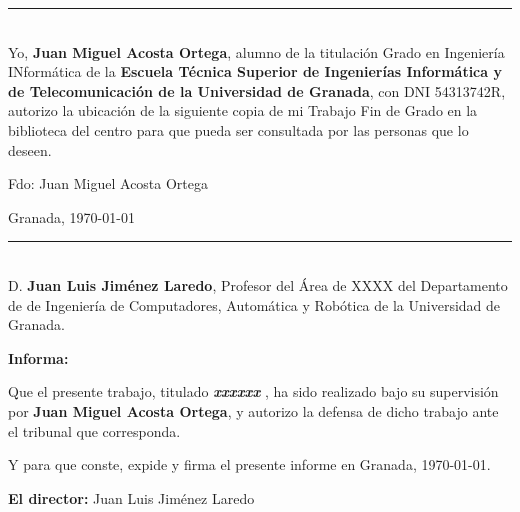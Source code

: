 \newpage \thispagestyle{empty} \mbox{} \newpage
\vspace{5cm}
\noindent\rule[-1ex]{\textwidth}{2pt}\\[4.5ex]

Yo, \textbf{Juan Miguel Acosta Ortega}, alumno de la titulación Grado en Ingeniería INformática de la \textbf{Escuela Técnica Superior
de Ingenierías Informática y de Telecomunicación de la Universidad de Granada}, con DNI 54313742R, autorizo la ubicación de la siguiente copia de mi Trabajo Fin de Grado en la biblioteca del centro para que pueda ser
consultada por las personas que lo deseen.

\vspace{6cm}

\noindent Fdo: Juan Miguel Acosta Ortega

\vspace{2cm}

\begin{flushright}
Granada, \today
\end{flushright}

\newpage \thispagestyle{empty} \mbox{} \newpage

\newpage
\vspace{5cm}
\noindent\rule[-1ex]{\textwidth}{2pt}\\[4.5ex]

D. \textbf{Juan Luis Jiménez Laredo}, Profesor del Área de XXXX
del Departamento de de Ingeniería de Computadores, Automática y Robótica de la Universidad de Granada.

\vspace{0.5cm}

\textbf{Informa:}

\vspace{0.5cm}

Que el presente trabajo, titulado \textit{\textbf{ xxxxxx }}, ha sido realizado bajo su supervisión por \textbf{Juan Miguel Acosta Ortega}, y autorizo la defensa de dicho trabajo ante el tribunal que corresponda.

\vspace{0.5cm}

Y para que conste, expide y firma el presente informe en Granada, \today.

\vspace{1cm}

\textbf{El director:} Juan Luis Jiménez Laredo

\newpage \thispagestyle{empty} \mbox{} \newpage